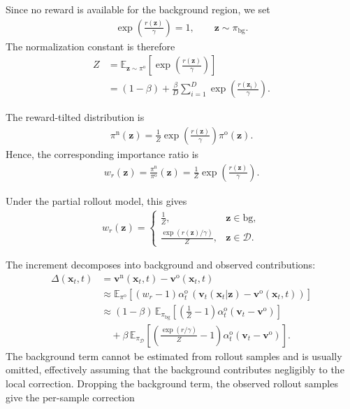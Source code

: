\documentclass{article} %
\begin{document}
Since no reward is available for the background region, we set
\begin{align}
\exp\left(\frac{r(\mathbf z)}{\gamma}\right)=1,
\qquad
\mathbf z\sim\pi_{\mathrm{bg}}.
\end{align}
The normalization constant is therefore
\begin{align}
Z
&=
\mathbb{E}_{\mathbf z\sim\pi^{\mathrm{o}}}
\left[
\exp\left(\frac{r(\mathbf z)}{\gamma}\right)
\right]
\\
&=
(1-\beta)
+
\frac{\beta}{D}
\sum_{i=1}^{D}
\exp\left(\frac{r(\mathbf z_i)}{\gamma}\right).
\end{align}

The reward-tilted distribution is
\begin{align}
\pi^{\mathrm{n}}(\mathbf z)
=
\frac{1}{Z}
\exp\left(\frac{r(\mathbf z)}{\gamma}\right)
\pi^{\mathrm{o}}(\mathbf z).
\end{align}
Hence, the corresponding importance ratio is
\begin{align}
w_r(\mathbf z)
=
\frac{\pi^{\mathrm{n}}}{\pi^{\mathrm{o}}}(\mathbf z)
=
\frac{1}{Z}
\exp\left(\frac{r(\mathbf z)}{\gamma}\right).
\end{align}

Under the partial rollout model, this gives
\begin{align}
w_r(\mathbf z)
=
\begin{cases}
\displaystyle
\frac{1}{Z},
& \mathbf z\in\mathrm{bg},
\\[3mm]
\displaystyle
\frac{
\exp\left(r(\mathbf z)/\gamma\right)
}{Z},
& \mathbf z\in\mathcal D.
\end{cases}
\end{align}


The increment decomposes into background and observed contributions:
\begin{align}
\Delta(\mathbf{x}_t,t)
&=
\mathbf{v}^{\mathrm{n}}(\mathbf{x}_t,t)
-
\mathbf{v}^{\mathrm{o}}(\mathbf{x}_t,t)
\\
&\approx
\mathbb{E}_{\pi^{\mathrm{o}}}
\left[
(w_r-1)\alpha_t^{\mathrm{o}}\,
\left(
\mathbf{v}_t(\mathbf{x}_t|\mathbf{z})
-
\mathbf{v}^{\mathrm{o}}(\mathbf{x}_t,t)
\right)
\right]
\\
&\approx
(1-\beta)\,
\mathbb{E}_{\pi_{\mathrm{bg}}}
\left[
\left(\frac{1}{Z}-1\right)
\alpha_t^{\mathrm{o}}
\left(\mathbf{v}_t-\mathbf{v}^{\mathrm{o}}\right)
\right]
\\
&\quad
+\beta\,
\mathbb{E}_{\pi_{\mathcal{D}}}
\left[
\left(
\frac{\exp(r/\gamma)}{Z}-1
\right)
\alpha_t^{\mathrm{o}}
\left(\mathbf{v}_t-\mathbf{v}^{\mathrm{o}}\right)
\right].
\end{align}
The background term cannot be estimated from rollout samples and is
usually omitted, effectively assuming that the background contributes
negligibly to the local correction. Dropping the background term, the
observed rollout samples give the per-sample correction
\end{document}
